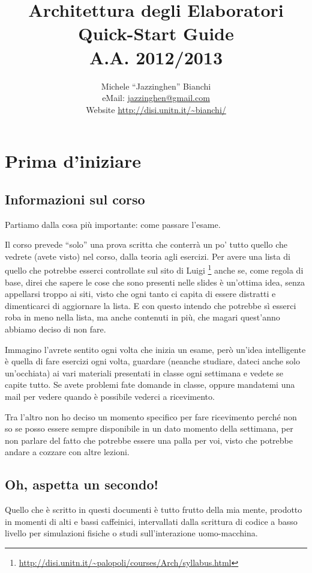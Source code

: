 \documentclass[a4paper]{memoir}
\title{Architettura degli Elaboratori \\ Quick-Start Guide \\ A.A. 2012/2013}
\author{Michele ``Jazzinghen'' Bianchi \\ eMail: \url{jazzinghen@gmail.com} \\%
	Website \url{http://disi.unitn.it/~bianchi/}}
\begin{document}
\maketitle

\chapter*{Prima d'iniziare}
	
	
	
	\section*{Informazioni sul corso}
	
		Partiamo dalla cosa più importante: come passare l'esame.
		
		Il corso prevede ``solo'' una prova scritta che conterrà un po' tutto quello
		che vedrete (avete visto) nel corso, dalla teoria agli esercizi. Per avere
		una lista di quello che potrebbe esserci controllate sul sito di Luigi
		\footnote{\url{http://disi.unitn.it/~palopoli/courses/Arch/syllabus.html}}
		anche se, come regola di base, direi che sapere le cose che sono presenti
		nelle slides è un'ottima idea, senza appellarsi troppo ai siti, visto che
		ogni tanto ci capita di essere distratti e dimenticarci di aggiornare la
		lista. E con questo intendo che potrebbe sì esserci roba in meno nella lista,
		ma anche contenuti in più, che magari quest'anno abbiamo deciso di non fare.
		
		Immagino
		l'avrete sentito ogni volta che inizia un esame, però un'idea intelligente
		è quella di fare esercizi ogni volta, guardare (neanche studiare, dateci anche
		solo un'occhiata) ai vari materiali presentati in classe ogni settimana e
		vedete se capite tutto. Se avete problemi fate domande in classe, oppure
		mandatemi una mail per vedere quando è possibile vederci a ricevimento.
		
		Tra l'altro non ho deciso un momento specifico per fare ricevimento perché
		non so se posso essere sempre disponibile in un dato momento della settimana,
		per non parlare del fatto che potrebbe essere una palla per voi, visto che
		potrebbe andare a cozzare con altre lezioni.
		
	\section*{Oh, aspetta un secondo!}
	
		Quello che è scritto in questi documenti è tutto frutto della mia mente,
		prodotto in momenti di alti e bassi caffeinici, intervallati dalla scrittura
		di codice a basso livello per simulazioni fisiche o studi sull'interazione
		uomo-macchina.
		
\end{document}
